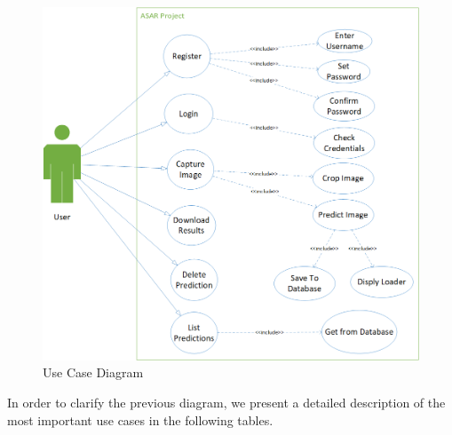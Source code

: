 \begin{figure}[H]
    \centering
    \includegraphics[width=14cm]{images/use case.png}
    \caption{Use Case Diagram}
    \label{fig:use-case-digram}
\end{figure}

\pagebreak
\noindent
In order to clarify the previous diagram, we present a detailed description of the most important use cases in the following tables. \\

